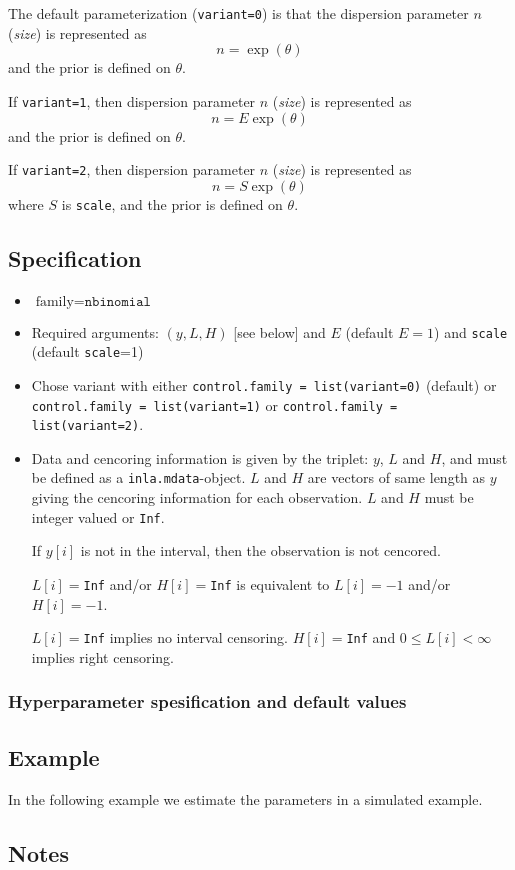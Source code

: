 \documentclass[a4paper,11pt]{article}
\begin{document}
The default parameterization (\verb|variant=0|) is that the dispersion
parameter $n$ (\emph{size}) is represented as
\begin{displaymath}
    n = \exp(\theta)
\end{displaymath}
and the prior is defined on $\theta$.

If \verb|variant=1|, then dispersion parameter $n$ (\emph{size}) is
represented as
\begin{displaymath}
    n = E\exp(\theta)
\end{displaymath}
and the prior is defined on $\theta$.

If \verb|variant=2|, then dispersion parameter $n$ (\emph{size}) is
represented as
\begin{displaymath}
    n = S\exp(\theta)
\end{displaymath}
where $S$ is \texttt{scale}, and the prior is defined on $\theta$.

\subsection*{Specification}

\begin{itemize}
\item $\text{family}=\texttt{nbinomial}$
\item Required arguments: $(y,L,H)$ [see below] and $E$ (default
    $E=1$) and \texttt{scale} (default \texttt{scale}=1)
\item Chose variant with either
    \verb|control.family = list(variant=0)| (default) or\\
    \verb|control.family = list(variant=1)| or
    \verb|control.family = list(variant=2)|.
\item Data and cencoring information is given by the triplet: $y$, $L$
    and $H$, and must be defined as a \texttt{inla.mdata}-object. $L$
    and $H$ are vectors of same length as $y$ giving the cencoring
    information for each observation. $L$ and $H$ must be integer
    valued or \texttt{Inf}.

    If $y[i]$ is not in the interval, then the observation is not
    cencored.

    $L[i]=$\texttt{Inf} and/or $H[i]=$\texttt{Inf} is equivalent to
    $L[i]= -1$ and/or $H[i] = -1$.

    $L[i]=$\texttt{Inf} implies no interval censoring.
    $H[i]=$\texttt{Inf} and $0\leq L[i]<\infty$ implies right
    censoring.

\end{itemize}
    

\subsubsection*{Hyperparameter spesification and default values}



\subsection*{Example}

In the following example we estimate the parameters in a simulated
example. {\small  }

\subsection*{Notes}
\end{document}
